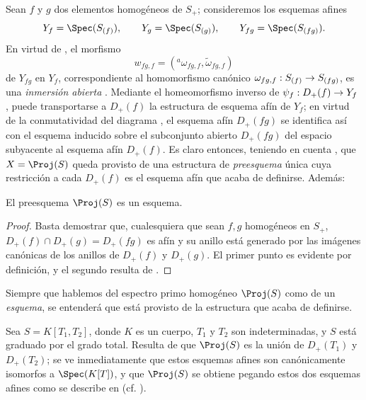 \documentclass[oneside,10pt]{amsart}
\makeatletter
\newcommand{\ega@arrow}[2]{\mathchoice{#1}{#2}{#2}{#2}}
\renewcommand{\to}{\ega@arrow{\longrightarrow}{\rightarrow}}
\newcommand{\oldpage}[2][]{\marginnote{\normalfont\footnotesize\textbf{#1}~|~#2}\ignorespaces}
\let\EGAOriginalLabel\label
\renewcommand{\label}[1]{\phantomsection\EGAOriginalLabel{#1}}
\makeatother
\begin{document}
\begin{env}[2.4.1]
\label{II.2.4.1}
Sean $f$ y $g$ dos elementos homogéneos de $S_+$; consideremos los esquemas afines
\[
  Y_f=\Spec(S_{(f)}),\qquad
  Y_g=\Spec(S_{(g)}),\qquad
  Y_{fg}=\Spec(S_{(fg)}).
\]
En virtud de , el morfismo
\[
  w_{fg,f}=({}^a\!\omega_{fg,f},\widetilde{\omega}_{fg,f})
\]
de $Y_{fg}$ en $Y_f$, correspondiente al homomorfismo canónico $\omega_{fg,f}:S_{(f)}\to S_{(fg)}$, es una \emph{inmersión abierta} .
Mediante el homeomorfismo inverso de $\psi_f:D_+(f)\to Y_f$ , puede transportarse a $D_+(f)$ la estructura de esquema afín de $Y_f$; en virtud de la conmutatividad del diagrama , el esquema afín $D_+(fg)$ se identifica así con el esquema inducido sobre el subconjunto abierto $D_+(fg)$ del espacio subyacente al esquema afín $D_+(f)$.
Es claro entonces, teniendo en cuenta , que $X=\Proj(S)$ queda provisto de una estructura de \emph{preesquema} única cuya restricción a cada $D_+(f)$ es el esquema afín que acaba de definirse.
Además:
\end{env}

\begin{proposition}[2.4.2]
\label{II.2.4.2}
El preesquema $\Proj(S)$ es un esquema.
\end{proposition}

\begin{proof}
Basta  demostrar que, cualesquiera que sean $f,g$ homogéneos en $S_+$, $D_+(f)\cap D_+(g)=D_+(fg)$ es afín y su anillo está generado por las imágenes canónicas de los anillos de $D_+(f)$ y $D_+(g)$.
El primer punto es evidente por definición, y el segundo resulta de .
\end{proof}

\oldpage[II]{29}
Siempre que hablemos del espectro primo homogéneo $\Proj(S)$ como de un \emph{esquema}, se entenderá que está provisto de la estructura que acaba de definirse.

\begin{example}[2.4.3]
\label{II.2.4.3}
Sea $S=K[T_1,T_2]$, donde $K$ es un cuerpo, $T_1$ y $T_2$ son indeterminadas, y $S$ está graduado por el grado total.
Resulta de  que $\Proj(S)$ es la unión de $D_+(T_1)$ y $D_+(T_2)$; se ve inmediatamente que estos esquemas afines son canónicamente isomorfos a $\Spec(K[T])$, y que $\Proj(S)$ se obtiene pegando estos dos esquemas afines como se describe en  (cf. ).
\end{example}
\end{document}
